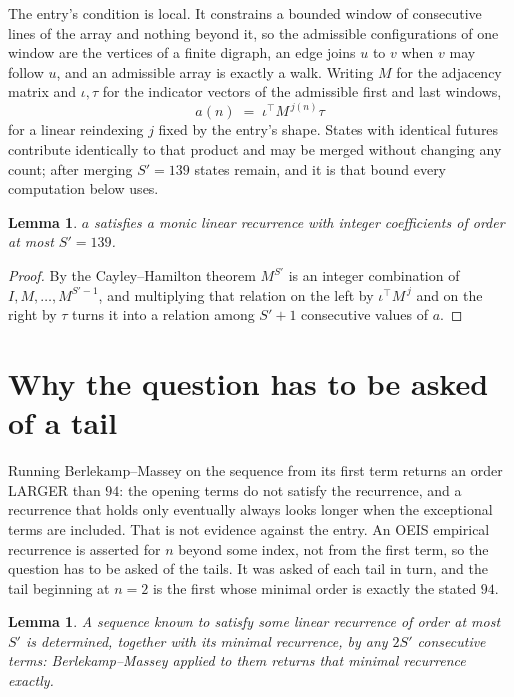 \documentclass[11pt,a4paper]{article}
\theoremstyle{plain}
\newtheorem{lemma}[theorem]{Lemma}
\theoremstyle{definition}
\begin{document}
The entry's condition is local. It constrains a bounded window of consecutive lines of the
array and nothing beyond it, so the admissible configurations of one window are the vertices of
a finite digraph, an edge joins $u$ to $v$ when $v$ may follow $u$, and an admissible array is
exactly a walk. Writing $M$ for the adjacency matrix and $\iota,\tau$ for the indicator vectors
of the admissible first and last windows,
\[
a(n)\;=\;\iota^{\!\top}M^{\,j(n)}\tau
\]
for a linear reindexing $j$ fixed by the entry's shape. States with identical futures
contribute identically to that product and may be merged without changing any count; after
merging $S'=139$ states remain, and it is that bound every computation below uses.

\begin{lemma}\label{lem:cf}
$a$ satisfies a monic linear recurrence with integer coefficients of order at most $S'=139$.
\end{lemma}

\begin{proof}
By the Cayley--Hamilton theorem $M^{S'}$ is an integer combination of $I,M,\dots,M^{S'-1}$,
and multiplying that relation on the left by $\iota^{\!\top}M^{\,j}$ and on the right by
$\tau$ turns it into a relation among $S'+1$ consecutive values of $a$.
\end{proof}

\section{Why the question has to be asked of a tail}

Running Berlekamp--Massey on the sequence from its first term returns an order LARGER than $94$: the opening terms do not satisfy the recurrence, and a recurrence that holds only eventually always looks longer when the exceptional terms are included. That is not evidence against the entry. An OEIS empirical recurrence is asserted for $n$ beyond some index, not from the first term, so the question has to be asked of the tails. It was asked of each tail in turn, and the tail beginning at $n=2$ is the first whose minimal order is exactly the stated $94$.

\begin{lemma}\label{lem:bm}
A sequence known to satisfy some linear recurrence of order at most $S'$ is determined,
together with its minimal recurrence, by any $2S'$ consecutive terms: Berlekamp--Massey applied
to them returns that minimal recurrence exactly.
\end{lemma}
\end{document}
